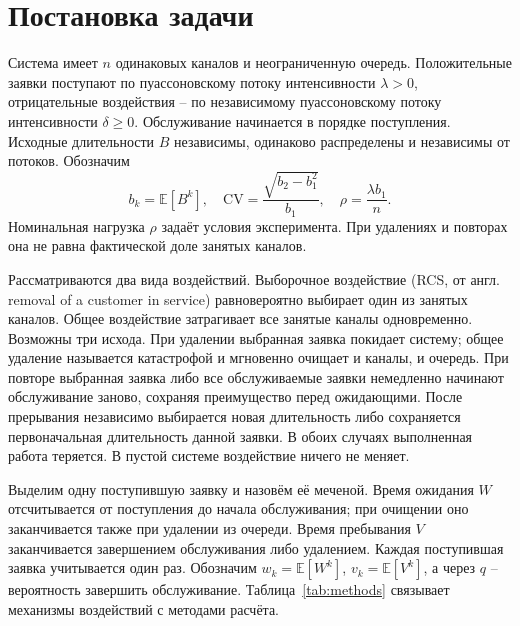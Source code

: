 \section{Постановка задачи}
Система имеет \(n\) одинаковых каналов и неограниченную очередь. Положительные заявки поступают по пуассоновскому потоку интенсивности \(\lambda>0\), отрицательные воздействия -- по независимому пуассоновскому потоку интенсивности \(\delta\ge0\). Обслуживание начинается в порядке поступления. Исходные длительности \(B\) независимы, одинаково распределены и независимы от потоков. Обозначим
\[
b_k=\mathbb E[B^k],\quad \mathrm{CV}=\frac{\sqrt{b_2-b_1^2}}{b_1},\quad \rho=\frac{\lambda b_1}{n}.
\]
Номинальная нагрузка \(\rho\) задаёт условия эксперимента. При удалениях и повторах она не равна фактической доле занятых каналов.

Рассматриваются два вида воздействий. Выборочное воздействие (RCS, от англ. removal of a customer in service) равновероятно выбирает один из занятых каналов. Общее воздействие затрагивает все занятые каналы одновременно. Возможны три исхода. При удалении выбранная заявка покидает систему; общее удаление называется катастрофой и мгновенно очищает и каналы, и очередь. При повторе выбранная заявка либо все обслуживаемые заявки немедленно начинают обслуживание заново, сохраняя преимущество перед ожидающими. После прерывания независимо выбирается новая длительность либо сохраняется первоначальная длительность данной заявки. В обоих случаях выполненная работа теряется. В пустой системе воздействие ничего не меняет.

Выделим одну поступившую заявку и назовём её меченой. Время ожидания \(W\) отсчитывается от поступления до начала обслуживания; при очищении оно заканчивается также при удалении из очереди. Время пребывания \(V\) заканчивается завершением обслуживания либо удалением. Каждая поступившая заявка учитывается один раз. Обозначим \(w_k=\mathbb E[W^k]\), \(v_k=\mathbb E[V^k]\), а через \(q\) -- вероятность завершить обслуживание. Таблица~\ref{tab:methods} связывает механизмы воздействий с методами расчёта.

